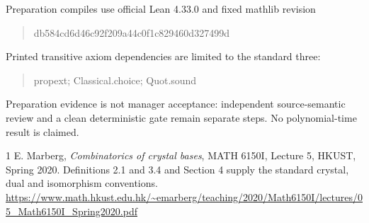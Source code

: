 \documentclass[11pt,a4paper]{article}
\begin{document}
Preparation compiles use official Lean 4.33.0 and fixed mathlib revision
\begin{quote}\ttfamily\small
db584cd6d46c92f209a44c0f1c829460d327499d
\end{quote}
Printed transitive axiom dependencies are limited to the standard three:
\begin{quote}\ttfamily\small
propext; Classical.choice; Quot.sound
\end{quote}
Preparation evidence is not manager acceptance:
independent source-semantic review and a clean deterministic gate remain
separate steps. No polynomial-time result is claimed.

\begin{thebibliography}{1}
E. Marberg, \emph{Combinatorics of crystal bases}, MATH 6150I, Lecture 5,
HKUST, Spring 2020. Definitions 2.1 and 3.4 and Section 4 supply the standard
crystal, dual and isomorphism conventions.
\url{https://www.math.hkust.edu.hk/~emarberg/teaching/2020/Math6150I/lectures/05_Math6150I_Spring2020.pdf}
\end{thebibliography}
\end{document}

